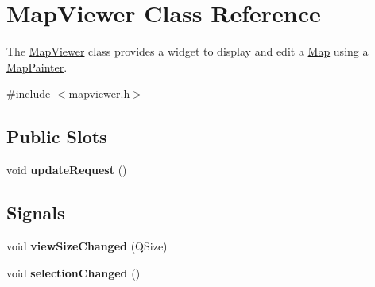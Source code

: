 \hypertarget{class_map_viewer}{\section{\-Map\-Viewer \-Class \-Reference}
\label{class_map_viewer}
}


\-The \hyperlink{class_map_viewer}{\-Map\-Viewer} class provides a widget to display and edit a \hyperlink{class_map}{\-Map} using a \hyperlink{class_map_painter}{\-Map\-Painter}.  




{\ttfamily \#include $<$mapviewer.\-h$>$}

\subsection*{\-Public \-Slots}
\begin{DoxyCompactItemize}
\item 
\hypertarget{class_map_viewer_af6db4693f536ea5ce8b7b6f05d4099ea}{void {\bfseries update\-Request} ()}\label{class_map_viewer_af6db4693f536ea5ce8b7b6f05d4099ea}

\end{DoxyCompactItemize}
\subsection*{\-Signals}
\begin{DoxyCompactItemize}
\item 
\hypertarget{class_map_viewer_afe0db95f8db428737b5225663dd2b127}{void {\bfseries view\-Size\-Changed} (\-Q\-Size)}\label{class_map_viewer_afe0db95f8db428737b5225663dd2b127}

\item 
\hypertarget{class_map_viewer_a60b95fc5e6817673a532b11a139a0eab}{void {\bfseries selection\-Changed} ()}\label{class_map_viewer_a60b95fc5e6817673a532b11a139a0eab}

\end{DoxyCompactItemize}
